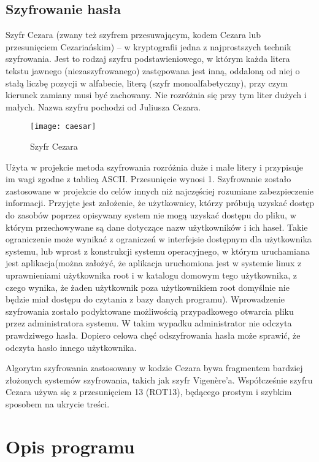 \documentclass[eng,printmode]{mgr}
\begin{document}
\section{Szyfrowanie hasła}

Szyfr Cezara (zwany też szyfrem przesuwającym, kodem Cezara lub przesunięciem Cezariańskim) – w kryptografii jedna z najprostszych technik szyfrowania. Jest to rodzaj szyfru podstawieniowego, w którym każda litera tekstu jawnego (niezaszyfrowanego) zastępowana jest inną, oddaloną od niej o stałą liczbę pozycji w alfabecie, literą (szyfr monoalfabetyczny), przy czym kierunek zamiany musi być zachowany. Nie rozróżnia się przy tym liter dużych i małych. Nazwa szyfru pochodzi od Juliusza Cezara\cite{szyfrcezara}.\\
\begin{figure}[placement h]
\texttt{[image: caesar]}
\caption{Szyfr Cezara}
\end{figure}

Użyta w projekcie metoda szyfrowania rozróżnia duże i małe litery i przypisuje im wagi zgodne z tablicą ASCII. Przesunięcie wynosi 1. Szyfrowanie zostało zastosowane w projekcie do celów innych niż najczęściej rozumiane zabezpieczenie informacji. Przyjęte jest założenie, że użytkownicy, którzy próbują uzyskać dostęp do zasobów poprzez opisywany system nie mogą uzyskać dostępu do pliku, w którym przechowywane są dane dotyczące nazw użytkowników i ich haseł. Takie ograniczenie może wynikać z ograniczeń w interfejsie dostępnym dla użytkownika systemu, lub wprost z konstrukcji systemu operacyjnego, w którym uruchamiana jest aplikacja(można założyć, że aplikacja uruchomiona jest w systemie linux z uprawnieniami użytkownika root i w katalogu domowym tego użytkownika, z czego wynika, że żaden użytkownik poza użytkownikiem root domyślnie nie będzie miał dostępu do czytania z bazy danych programu). Wprowadzenie szyfrowania zostało podyktowane możliwością przypadkowego otwarcia pliku przez administratora systemu. W takim wypadku administrator nie odczyta prawdziwego hasła. Dopiero celowa chęć odszyfrowania hasła może sprawić, że odczyta hasło innego użytkownika.

Algorytm szyfrowania zastosowany w kodzie Cezara bywa fragmentem bardziej złożonych systemów szyfrowania, takich jak szyfr Vigenère'a. Współcześnie szyfru Cezara używa się z przesunięciem 13 (ROT13), będącego prostym i szybkim sposobem na ukrycie treści.
\chapter{Opis programu}
\end{document}
